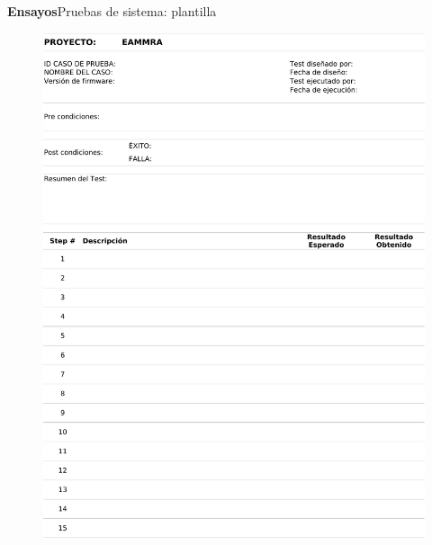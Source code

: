 \documentclass[11pt, xcolor={table,xcdraw}]{beamer}
\begin{document}
\begin{frame}{\textbf{\LARGE{Ensayos}}}{Pruebas de sistema: plantilla}
	\vspace{-.55cm}
	\begin{figure}[H]
		\includegraphics[width=1\textwidth]{./imagenes/UseCaseTemplate.pdf}
	\end{figure}	
\end{frame}
\end{document}
